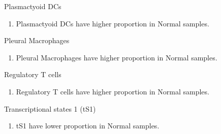 \documentclass{beamer}
\begin{document}
\begin{frame}[allowframebreaks]
        \begin{block}{Plasmactyoid DCs}
            \begin{enumerate}
                \item Plasmactyoid DCs have higher proportion in Normal samples.
            \end{enumerate}
        \end{block}

        \begin{block}{Pleural Macrophages}
            \begin{enumerate}
                \item Pleural Macrophages have higher proportion in Normal samples.
            \end{enumerate}
        \end{block}

        \begin{block}{Regulatory T cells}
            \begin{enumerate}
                \item Regulatory T cells have higher proportion in Normal samples.
            \end{enumerate}
        \end{block}

        \begin{block}{Transcriptional states 1 (tS1)}
            \begin{enumerate}
                \item tS1 have lower proportion in Normal samples.
            \end{enumerate}
        \end{block}
    \end{frame}
\end{document}
